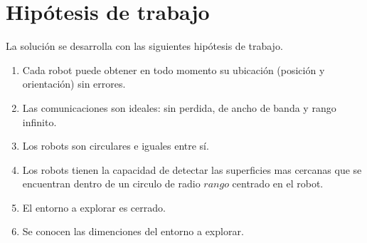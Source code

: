 
\section{Hipótesis de trabajo}\label{sec:hip}
La solución se desarrolla con las siguientes hipótesis de trabajo.
\begin{enumerate}[label=(\roman*)]
  \item Cada robot puede obtener en todo momento su ubicación (posición y
    orientación) sin errores.
  \item Las comunicaciones son ideales: sin perdida, de ancho de banda y rango infinito.
  \item Los robots son circulares e iguales entre sí.
  \item Los robots tienen la capacidad de detectar las superficies mas cercanas
    que se encuentran dentro de un circulo de radio $rango$ centrado en el
    robot.
  \item El entorno a explorar es cerrado.
  \item Se conocen las dimenciones del entorno a explorar.
\end{enumerate}

